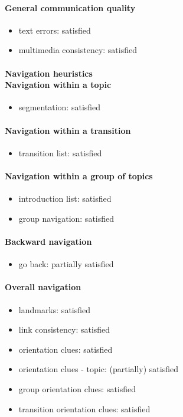 \begin{enumerate}
	\paragraph*{General communication quality}
	\begin{itemize}
		\item text errors: satisfied
		\item multimedia consistency: satisfied
	\end{itemize}

	\paragraph*{Navigation heuristics \\ Navigation within a topic}
	\begin{itemize}
		\item segmentation: satisfied
	\end{itemize}	
	
	\paragraph*{Navigation within a transition}
	\begin{itemize}
		\item transition list: satisfied
	\end{itemize}
	
	\paragraph*{Navigation within a group of topics}
	\begin{itemize}
		\item introduction list: satisfied
		\item group navigation: satisfied
	\end{itemize}

	\paragraph*{Backward navigation}
	\begin{itemize}
		\item go back: partially satisfied
	\end{itemize}
	
	\paragraph*{Overall navigation}
	\begin{itemize}
		\item landmarks: satisfied
		\item link consistency: satisfied
		\item orientation clues: satisfied
		\item orientation clues - topic: (partially) satisfied
		\item group orientation clues: satisfied
		\item transition orientation clues: satisfied
	\end{itemize}	
	

\end{enumerate}
